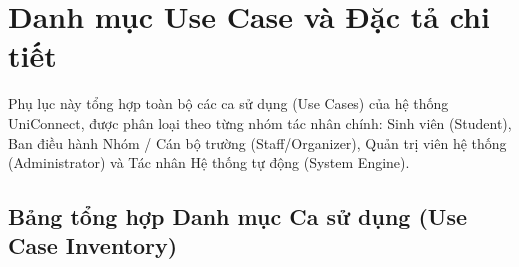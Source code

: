 \chapter{Danh mục Use Case và Đặc tả chi tiết}
\label{apd:A}

Phụ lục này tổng hợp toàn bộ các ca sử dụng (Use Cases) của hệ thống UniConnect, được phân loại theo từng nhóm tác nhân chính: Sinh viên (Student), Ban điều hành Nhóm / Cán bộ trường (Staff/Organizer), Quản trị viên hệ thống (Administrator) và Tác nhân Hệ thống tự động (System Engine).

\section{Bảng tổng hợp Danh mục Ca sử dụng (Use Case Inventory)}

\begingroup
\singlespacing
\small
\renewcommand{\arraystretch}{1.05}
